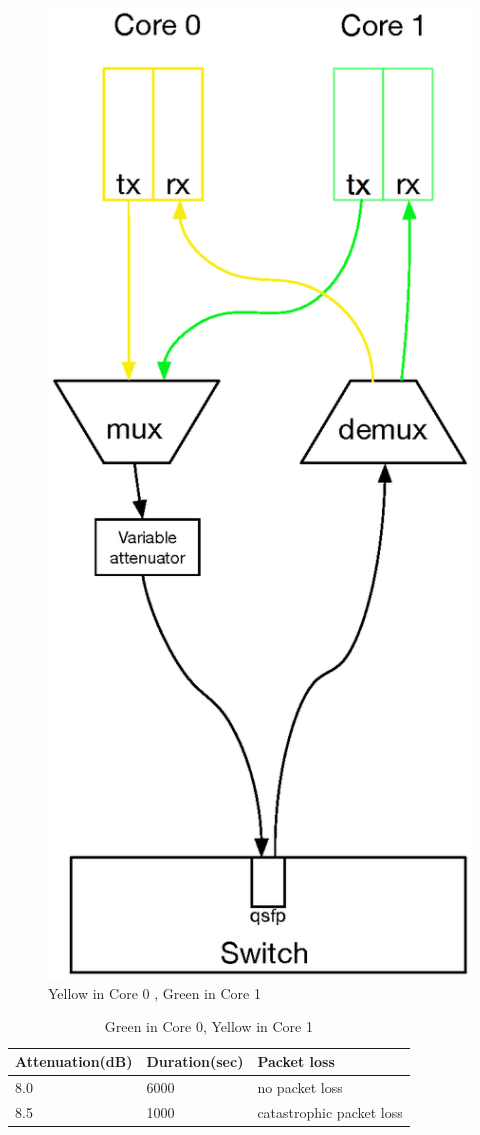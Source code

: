 \documentclass{article}
\begin{document}
{\begin{figure}[h!]
\begin{minipage}{.5\textwidth}
		\includegraphics[width = .6\linewidth]{yellowgreencore1vartxcom.eps}
		\caption{Yellow in Core 0 , Green in Core 1}
		\label{fig:yellowcore0}
	\end{minipage}
\end{figure}
\begin{table}[ht]
\begin{minipage}{.5\textwidth}
\begin{center}
\begin{tabular}{|p{2.5cm}|p{2.5cm}|p{2.5cm}|}
	\hline
	 Attenuation(dB) & Duration(sec) & Packet loss \\ \hline
	 8.0  &  6000 & no packet loss \\ \hline
	 8.5  & 1000 & catastrophic packet loss \\ \hline
\end{tabular}
\end{center}
\caption{Green in Core 0, Yellow in Core 1}
\label{table:yellowcore1}

\end{minipage}
\end{table}}
\end{document}
